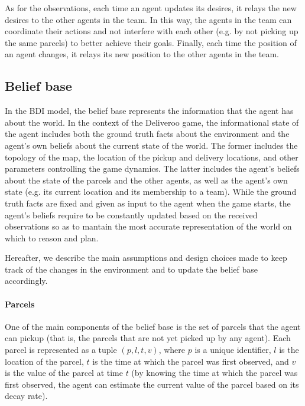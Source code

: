 As for the observations, each time an agent updates its desires, it relays the new desires to the other agents in the team. In this way, the agents in the team can coordinate their actions and not interfere with each other (e.g. by not picking up the same parcels) to better achieve their goals. Finally, each time the position of an agent changes, it relays its new position to the other agents in the team.

\subsection{Belief base}
\label{sec:belief-base}

In the BDI model, the belief base represents the information that the agent has about the world. In the context of the Deliveroo game, the informational state of the agent includes both the ground truth facts about the environment and the agent's own beliefs about the current state of the world. The former includes the topology of the map, the location of the pickup and delivery locations, and other parameters controlling the game dynamics. The latter includes the agent's beliefs about the state of the parcels and the other agents, as well as the agent's own state (e.g. its current location and its membership to a team). While the ground truth facts are fixed and given as input to the agent when the game starts, the agent's beliefs require to be constantly updated based on the received observations so as to mantain the most accurate representation of the world on which to reason and plan.

Hereafter, we describe the main assumptions and design choices made to keep track of the changes in the environment and to update the belief base accordingly.

\paragraph*{Parcels}
One of the main components of the belief base is the set of parcels that the agent can pickup (that is, the parcels that are not yet picked up by any agent). Each parcel is represented as a tuple $(p, l, t, v)$, where $p$ is a unique identifier, $l$ is the location of the parcel, $t$ is the time at which the parcel was first observed, and $v$ is the value of the parcel at time $t$ (by knowing the time at which the parcel was first observed, the agent can estimate the current value of the parcel based on its decay rate).

